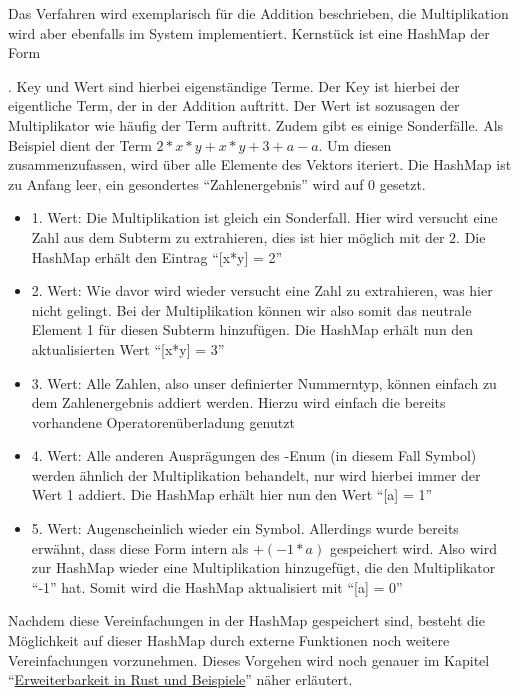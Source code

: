 \documentclass[11pt,a4paper, ngerman]{article}
\begin{document}
Das Verfahren wird exemplarisch für die Addition beschrieben, die Multiplikation wird aber ebenfalls im System implementiert. Kernstück ist eine HashMap der Form

. Key und Wert sind hierbei eigenständige Terme. Der Key ist hierbei der eigentliche Term, der in der Addition auftritt. Der Wert ist sozusagen der Multiplikator wie häufig der Term auftritt. Zudem gibt es einige Sonderfälle. Als Beispiel dient der Term 
$2*x*y + x*y + 3 + a - a$. Um diesen zusammenzufassen, wird über alle Elemente des Vektors iteriert. Die HashMap ist zu Anfang leer, ein gesondertes ``Zahlenergebnis'' wird auf 0 gesetzt.

\begin{itemize}
    \item 1. Wert: Die Multiplikation ist gleich ein Sonderfall. Hier wird versucht eine Zahl aus dem Subterm zu extrahieren, dies ist hier möglich mit der $2$. Die HashMap erhält den Eintrag ``[x*y] = 2''
    \item 2. Wert: Wie davor wird wieder versucht eine Zahl zu extrahieren, was hier nicht gelingt. Bei der Multiplikation können wir also somit das neutrale Element 1 für diesen Subterm hinzufügen. Die HashMap erhält nun den aktualisierten Wert ``[x*y] = 3''
    \item 3. Wert: Alle Zahlen, also unser definierter Nummerntyp, können einfach zu dem Zahlenergebnis addiert werden. Hierzu wird einfach die bereits vorhandene Operatorenüberladung genutzt
    \item 4. Wert: Alle anderen Ausprägungen des -Enum (in diesem Fall Symbol) werden ähnlich der Multiplikation behandelt, nur wird hierbei immer der Wert 1 addiert. Die HashMap erhält hier nun den Wert ``[a] = 1''
    \item 5. Wert: Augenscheinlich wieder ein Symbol. Allerdings wurde bereits erwähnt, dass diese Form intern als $+(-1*a)$ gespeichert wird. Also wird zur HashMap wieder eine Multiplikation hinzugefügt, die den Multiplikator ``-1'' hat. Somit wird die HashMap aktualisiert mit ``[a] = 0''
\end{itemize}

Nachdem diese Vereinfachungen in der HashMap gespeichert sind, besteht die Möglichkeit auf dieser HashMap durch externe Funktionen noch weitere Vereinfachungen vorzunehmen. Dieses Vorgehen wird noch genauer im Kapitel ``\hyperref[sec:kapErRustUndBei]{Erweiterbarkeit in Rust und Beispiele}'' näher erläutert.
\end{document}
